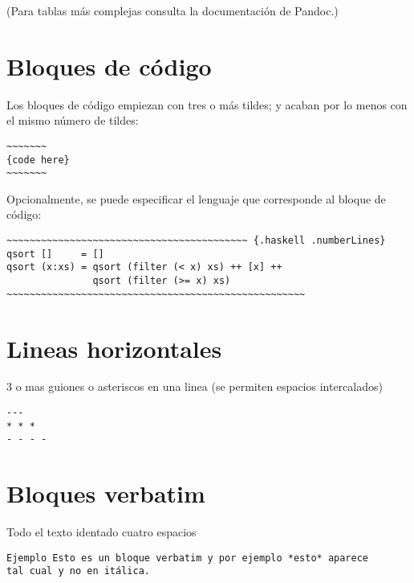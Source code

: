 \documentclass[12pt,spanish,]{article}
\begin{document}
(Para tablas más complejas consulta la documentación de Pandoc.)

\section{Bloques de código}\label{bloques-de-cuxf3digo}

Los bloques de código empiezan con tres o más tildes; y acaban por lo
menos con el mismo número de tildes:

\begin{verbatim}
~~~~~~~
{code here}
~~~~~~~
\end{verbatim}

Opcionalmente, se puede especificar el lenguaje que corresponde al
bloque de código:

\begin{verbatim}
~~~~~~~~~~~~~~~~~~~~~~~~~~~~~~~~~~~~~~~~~~ {.haskell .numberLines}
qsort []     = []
qsort (x:xs) = qsort (filter (< x) xs) ++ [x] ++
               qsort (filter (>= x) xs)
~~~~~~~~~~~~~~~~~~~~~~~~~~~~~~~~~~~~~~~~~~~~~~~~~~~~
\end{verbatim}

\section{Lineas horizontales}\label{lineas-horizontales}

3 o mas guiones o asteriscos en una linea (se permiten espacios
intercalados)

\begin{verbatim}
---
* * *
- - - -
\end{verbatim}

\section{Bloques verbatim}\label{bloques-verbatim}

Todo el texto identado cuatro espacios

\begin{verbatim}
Ejemplo Esto es un bloque verbatim y por ejemplo *esto* aparece
tal cual y no en itálica.
\end{verbatim}
\end{document}
